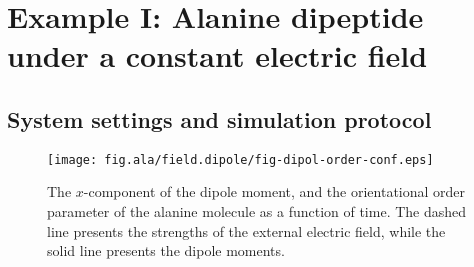 \documentclass[a4paper,preprint,unsortedaddress,onecolumn]{revtex4-1}
\begin{document}

\section{Example I: Alanine dipeptide
  under a constant electric field}

\subsection{System settings and simulation protocol}
\begin{figure}
  \centering
  \texttt{[image: fig.ala/field.dipole/fig-dipol-order-conf.eps]}
  \caption{The
    $x$-component of the dipole moment, and the orientational order parameter
    of the alanine molecule as a
    function of time. The dashed line presents the strengths of the
    external electric field, while the solid line presents the dipole
    moments. }
  \label{fig:tmp3}
\end{figure}
\end{document}
